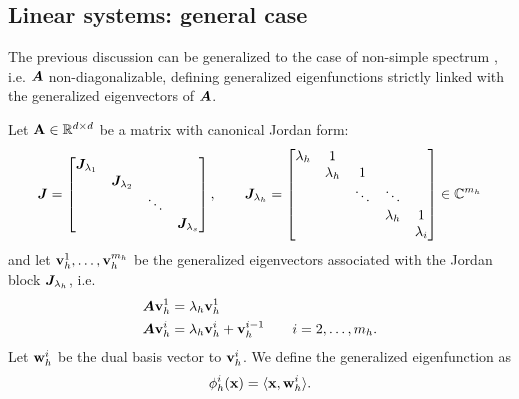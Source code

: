 \subsection{Linear systems: general case}
The previous discussion can be generalized to the case of non-simple spectrum \cite{mezic_spectrum_2019}, i.e. $\vb*{A}$ non-diagonalizable, defining generalized eigenfunctions strictly linked with the generalized eigenvectors of $\vb*{A}$.
\begin{definition}
\label{gen_eigenfunction_def}
Let $\vb{A}\in\mathbb{R}^{d\times d}$ be a matrix with canonical Jordan form:
\begin{equation*}
    \vb*{J} = 
    \begin{bmatrix}
    \vb*{J}_{\lambda_1} & & & \\
    & \vb*{J}_{\lambda_2} & & \\
    & & \ddots & \\
    & & & \vb*{J}_{\lambda_s} \\
    \end{bmatrix}, \qquad 
    \vb*{J}_{\lambda_h} =
    \begin{bmatrix}
    \lambda_h & 1 & & & \\
    & \lambda_h & 1 & & \\
    & & \ddots &\ddots & \\
    & & & \lambda_h & 1\\
    & & & & \lambda_i \\
    \end{bmatrix} \in \mathbb{C}^{m_h}
\end{equation*}
and let $\vb{v}_h^1,\dots, \vb{v}_h^{m_h}$ be the generalized eigenvectors associated with the Jordan block $\vb*{J}_{\lambda_h}$, i.e.
\begin{equation*}
    \begin{split}
        \vb*{A}\vb{v}_h^1 &= \lambda_h \vb{v}_h^1 \\
        \vb*{A}\vb{v}_h^i &= \lambda_h \vb{v}_h^i + \vb{v}_h^{i-1} \qquad i = 2,\dots,m_h. 
    \end{split}
\end{equation*}
Let $\vb{w}_h^i$ be the dual basis vector to $\vb{v}_h^i$. We define the generalized eigenfunction as
\begin{equation}
    \phi_h^i(\vb{x}) = \langle \vb{x}, \vb{w}_h^i \rangle.
\end{equation}
\end{definition}


